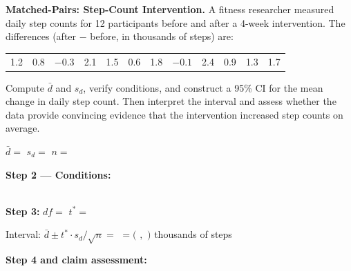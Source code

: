 \documentclass[10pt]{article}
\begin{document}
\begin{tcolorbox}[colback=white, colframe=black!40, title=\textbf{Tier E --- Extension},
    fonttitle=\bfseries, arc=2mm, left=3mm, right=3mm, top=2mm, bottom=2mm]

\textbf{Matched-Pairs: Step-Count Intervention.} A fitness researcher measured daily
step counts for 12 participants before and after a 4-week intervention. The differences
(after $-$ before, in thousands of steps) are:

\medskip
\begin{center}
\begin{tabular}{cccccccccccc}
1.2 & 0.8 & $-0.3$ & 2.1 & 1.5 & 0.6 & 1.8 & $-0.1$ & 2.4 & 0.9 & 1.3 & 1.7
\end{tabular}
\end{center}
\medskip

Compute $\bar d$ and $s_d$, verify conditions, and construct a 95\% CI for the mean
change in daily step count. Then interpret the interval and assess whether the data
provide convincing evidence that the intervention increased step counts on average.

$\bar d = $  \quad $s_d = $  \quad $n = $ 

\vspace{0.1in}
\textbf{Step 2 --- Conditions:} \\\\

\textbf{Step 3:} $df = $  \quad $t^* = $ 

Interval: $\bar d \pm t^* \cdot s_d/\sqrt{n} = $  $= ($  $,$  $)$ thousands of steps

\textbf{Step 4 and claim assessment:} \\\\

\end{tcolorbox}
\end{document}

